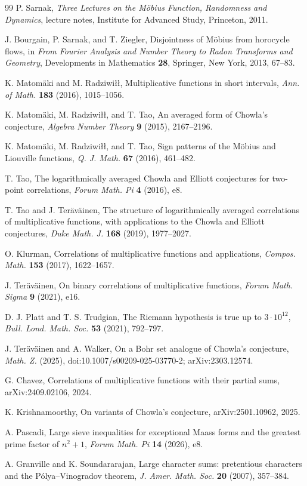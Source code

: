 \documentclass[11pt]{article}
\begin{document}
\begin{thebibliography}{99}
P. Sarnak, \textit{Three Lectures on the M\"obius Function, Randomness and Dynamics}, lecture notes,
Institute for Advanced Study, Princeton, 2011.

J. Bourgain, P. Sarnak, and T. Ziegler, Disjointness of M\"obius from horocycle flows, in
\textit{From Fourier Analysis and Number Theory to Radon Transforms and Geometry}, Developments in
Mathematics \textbf{28}, Springer, New York, 2013, 67--83.

K. Matom\"aki and M. Radziwi\l\l, Multiplicative functions in short intervals, \textit{Ann. of Math.}
\textbf{183} (2016), 1015--1056.

K. Matom\"aki, M. Radziwi\l\l, and T. Tao, An averaged form of Chowla's conjecture, \textit{Algebra
Number Theory} \textbf{9} (2015), 2167--2196.

K. Matom\"aki, M. Radziwi\l\l, and T. Tao, Sign patterns of the M\"obius and Liouville functions,
\textit{Q. J. Math.} \textbf{67} (2016), 461--482.

T. Tao, The logarithmically averaged Chowla and Elliott conjectures for two-point correlations,
\textit{Forum Math. Pi} \textbf{4} (2016), e8.

T. Tao and J. Ter\"av\"ainen, The structure of logarithmically averaged correlations of multiplicative
functions, with applications to the Chowla and Elliott conjectures, \textit{Duke Math. J.} \textbf{168}
(2019), 1977--2027.

O. Klurman, Correlations of multiplicative functions and applications, \textit{Compos. Math.}
\textbf{153} (2017), 1622--1657.

J. Ter\"av\"ainen, On binary correlations of multiplicative functions, \textit{Forum Math. Sigma}
\textbf{9} (2021), e16.

D. J. Platt and T. S. Trudgian, The Riemann hypothesis is true up to $3\cdot10^{12}$, \textit{Bull. Lond.
Math. Soc.} \textbf{53} (2021), 792--797.

J. Ter\"av\"ainen and A. Walker, On a Bohr set analogue of Chowla's conjecture, \textit{Math. Z.}
(2025), doi:10.1007/s00209-025-03770-2; arXiv:2303.12574.

G. Chavez, Correlations of multiplicative functions with their partial sums, arXiv:2409.02106, 2024.

K. Krishnamoorthy, On variants of Chowla's conjecture, arXiv:2501.10962, 2025.

A. Pascadi, Large sieve inequalities for exceptional Maass forms and the greatest prime factor of
$n^2+1$, \textit{Forum Math. Pi} \textbf{14} (2026), e8.

A. Granville and K. Soundararajan, Large character sums: pretentious characters and the
P\'olya--Vinogradov theorem, \textit{J. Amer. Math. Soc.} \textbf{20} (2007), 357--384.

\end{thebibliography}
\end{document}
